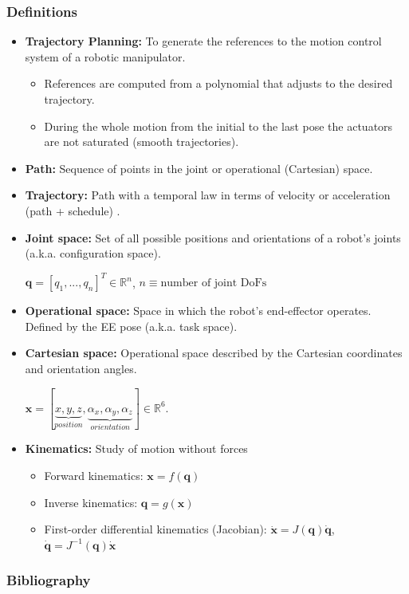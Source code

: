 \documentclass[10pt, aspectratio=169]{beamer}
\theoremstyle{remark}
\theoremstyle{definition}
\begin{document}
\begin{frame}[allowframebreaks]
\frametitle{Definitions}
	\begin{itemize}
    
	    \item \textbf{Trajectory Planning:} To generate the references to the motion control system of a robotic manipulator.
        \begin{itemize}
            \item References are computed from a polynomial that adjusts to the desired trajectory.
            \item During the whole motion from the initial to the last pose the actuators are not saturated (smooth trajectories).
        \end{itemize}
        
    \item \textbf{Path:} Sequence of points in the joint or operational (Cartesian) space. 
    
    \item \textbf{Trajectory:} Path with a temporal law in terms of velocity or acceleration (path + schedule) \cite{paths_and_trajectories}.
    
    \item \textbf{Joint space:} Set of all possible positions and orientations of a robot's joints (a.k.a. configuration space).
    
    $\mathbf{q} = [q_1, ..., q_n ]^T \in \mathbb{R}^n$, $n \equiv \textrm{number of joint DoFs}$ 

    \framebreak
    
    \item \textbf{Operational space:} Space in which the robot's end-effector operates. Defined by the EE pose (a.k.a. task space).

    \item \textbf{Cartesian space:} Operational space described by the Cartesian coordinates and orientation angles.
    
    $\mathbf{x} = [\underbrace{x, y, z}_{position}, \underbrace{\alpha_x, \alpha_y, \alpha_z}_{orientation}] \in \mathbb{R}^6$.

    \item \textbf{Kinematics:} Study of motion without forces

    \begin{itemize}
        \item Forward kinematics: $\mathbf{x} = f(\mathbf{q})$
        \item Inverse kinematics: $\mathbf{q} = g(\mathbf{x})$
        \item First-order differential kinematics (Jacobian): $\mathbf{\dot{x}} = J(\mathbf{q})\mathbf{\dot{q}}$, \hspace{0.2cm} $\mathbf{\dot{q}} = J^{-1}(\mathbf{q})\mathbf{\dot{x}}$
    \end{itemize}
    
	\end{itemize}
	
\end{frame}

\begin{frame}[allowframebreaks]
\frametitle{Bibliography}
\printbibliography
\end{frame}
\end{document}
